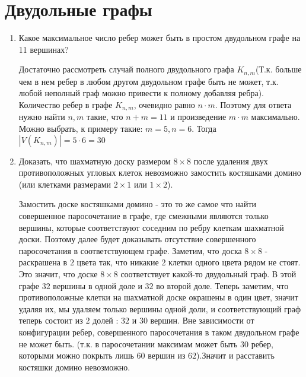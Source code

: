 \documentclass[fleqn]{article}
\begin{document}
	\section{Двудольные графы}
	\begin{enumerate}
		\item Какое максимальное число ребер может быть в простом двудольном графе на 11 вершинах?
		
		Достаточно рассмотреть случай полного двудольного графа $K_{n,m}$(Т.к. больше чем в нем ребер в любом другом двудольном графе быть не может, т.к. любой неполный граф можно привести к полному добавляя ребра). Количество ребер в графе $K_{n,m}$, очевидно равно $n\cdot m$. Поэтому для ответа нужно найти $n, m$ такие, что $n+m = 11$ и произведение $m\cdot m$ максимально. Можно выбрать, к примеру такие: $m = 5, n = 6$. Тогда $|V(K_{n,m})| = 5\cdot6 = 30$
		
		\item Доказать, что шахматную доску размером $8\times8$ после удаления двух противоположных угловых клеток невозможно замостить костяшками домино (или клетками размерами $2\times1$ или $1\times 2$).
		
		Замостить доске костяшками домино - это то же самое что найти совершенное паросочетание в графе, где смежными являются только вершины, которые соответствуют соседним по ребру клеткам шахматной доски. Поэтому далее будет доказывать отсутствие совершенного паросочетания в соответствующем графе. Заметим, что доска $8\times8$ - раскрашена в $2$ цвета так, что никакие $2$ клетки одного цвета рядом не стоят. Это значит, что доске $8\times 8$ соответствует какой-то двудольный граф. В этой графе $32$ вершины в одной доле и $32$ во второй доле. Теперь заметим, что противоположные клетки на шахматной доске окрашены в один цвет, значит удаляя их, мы удаляем только вершины одной доли, и соответствующий граф теперь состоит из $2$ долей : $32$ и $30$ вершин. Вне зависимости от конфигурации ребер, совершенного паросочетания в таком двудольном графе не может быть. (т.к. в паросочетании максимам может быть $30$ ребер, которыми можно покрыть лишь $60$ вершин из $62$).Значит и расставить костяшки домино невозможно.
		
	\end{enumerate}
	
\end{document}
